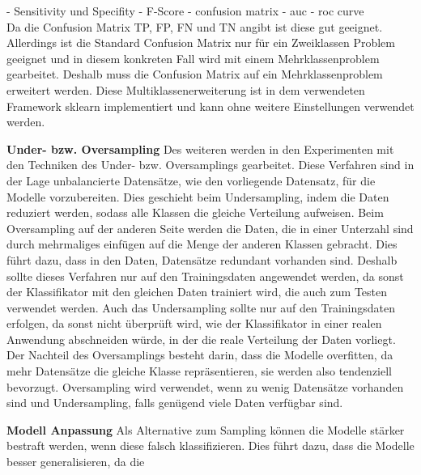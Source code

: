 - Sensitivity und Specifity
- F-Score
- confusion matrix
- auc - roc curve \\
Da die Confusion Matrix TP, FP, FN und TN angibt ist diese gut geeignet. 
Allerdings ist die Standard Confusion Matrix nur für ein Zweiklassen Problem geeignet und in diesem konkreten Fall wird mit einem Mehrklassenproblem gearbeitet.
Deshalb muss die Confusion Matrix auf ein Mehrklassenproblem erweitert werden.
Diese Multiklassenerweiterung ist in dem verwendeten Framework sklearn implementiert und kann ohne weitere Einstellungen verwendet werden.

\textbf{Under- bzw. Oversampling}
Des weiteren werden in den Experimenten mit den Techniken des Under- bzw. Oversamplings gearbeitet. 
Diese Verfahren sind in der Lage unbalancierte Datensätze, wie den vorliegende Datensatz, für die Modelle vorzubereiten. 
Dies geschieht beim Undersampling, indem die Daten reduziert werden, sodass alle Klassen die gleiche Verteilung aufweisen. 
Beim Oversampling auf der anderen Seite werden die Daten, die in einer Unterzahl sind durch mehrmaliges einfügen auf die Menge der anderen Klassen gebracht. 
Dies führt dazu, dass in den Daten, Datensätze redundant vorhanden sind. 
Deshalb sollte dieses Verfahren nur auf den Trainingsdaten angewendet werden, da sonst der Klassifikator mit den gleichen Daten trainiert wird, die auch zum Testen verwendet werden. 
Auch das Undersampling sollte nur auf den Trainingsdaten erfolgen, da sonst nicht überprüft wird, wie der Klassifikator in einer realen Anwendung abschneiden würde, in der die reale Verteilung der Daten vorliegt. \cite{ZITAT}
\cite{ML 3.6.3 Sampling}
Der Nachteil des Oversamplings besteht darin, dass die Modelle overfitten, da mehr Datensätze die gleiche Klasse repräsentieren, sie werden also tendenziell bevorzugt. 
\cite{ML 4.4.4 Tree Pruning}
Oversampling wird verwendet, wenn zu wenig Datensätze vorhanden sind und Undersampling, falls genügend viele Daten verfügbar sind. 

\textbf{Modell Anpassung}
Als Alternative zum Sampling können die Modelle stärker bestraft werden, wenn diese falsch klassifizieren. 
Dies führt dazu, dass die Modelle besser generalisieren, da die 


